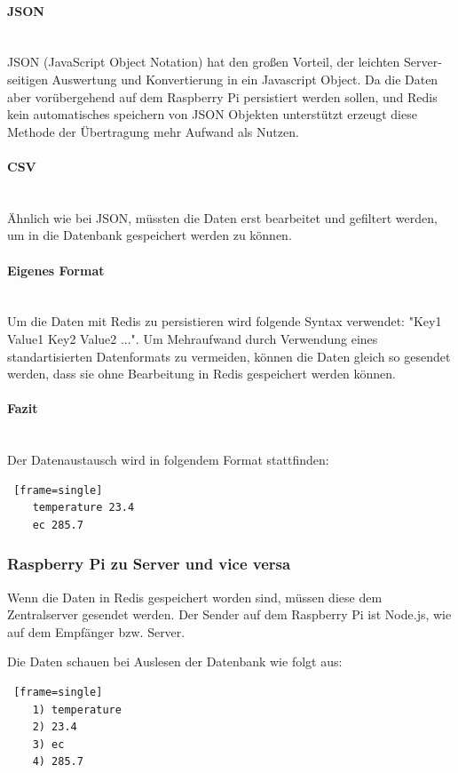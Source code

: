 \paragraph{JSON} \mbox{}\\
JSON (JavaScript Object Notation) hat den gro{\ss}en Vorteil, der leichten Server-seitigen Auswertung und Konvertierung in ein Javascript Object. Da die Daten aber vor\"ubergehend auf dem Raspberry Pi persistiert werden sollen, und Redis kein automatisches speichern von JSON Objekten unterst\"utzt erzeugt diese Methode der \"Ubertragung mehr Aufwand als Nutzen.
\paragraph{CSV} \mbox{}\\
\"Ahnlich wie bei JSON, m\"ussten die Daten erst bearbeitet und gefiltert werden, um in die Datenbank gespeichert werden zu k\"onnen.
\paragraph{Eigenes Format} \mbox{}\\
Um die Daten mit Redis zu persistieren wird folgende Syntax verwendet: "Key1 Value1 Key2 Value2 ...". Um Mehraufwand durch Verwendung eines standartisierten Datenformats zu vermeiden, k\"onnen die Daten gleich so gesendet werden, dass sie ohne Bearbeitung in Redis gespeichert werden k\"onnen.
\paragraph{Fazit} \mbox{}\\
Der Datenaustausch wird in folgendem Format stattfinden:
\begin{lstlisting} [frame=single]
	temperature 23.4 
	ec 285.7
\end{lstlisting}

\subsubsection{Raspberry Pi zu Server und vice versa}
Wenn die Daten in Redis gespeichert worden sind, m\"ussen diese dem Zentralserver gesendet werden. Der Sender auf dem Raspberry Pi ist Node.js, wie auf dem Empf\"anger bzw. Server.

Die Daten schauen bei Auslesen der Datenbank wie folgt aus:
\begin{lstlisting} [frame=single]
	1) temperature
	2) 23.4
	3) ec
	4) 285.7
\end{lstlisting}

